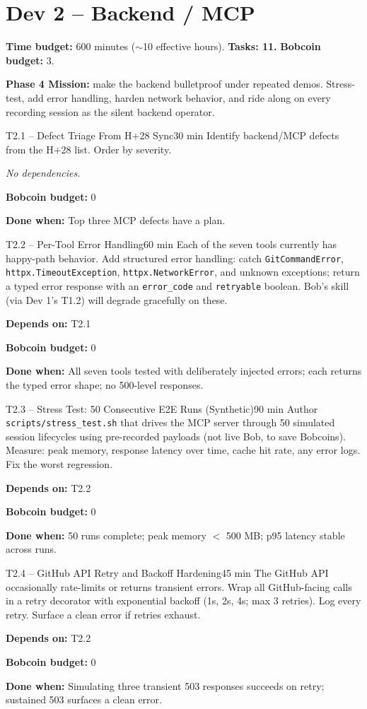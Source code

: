 \documentclass[11pt,letterpaper]{article}
\newcommand{\acceptance}[1]{\par\smallskip\textcolor{ibmgreen}{\textbf{Done when:}} #1}
\newcommand{\depends}[1]{\par\smallskip\textcolor{ibmorange}{\textbf{Depends on:}} #1}
\newcommand{\nodep}{\par\smallskip\textcolor{ibmgray}{\textit{No dependencies.}}}
\newcommand{\bobcost}[1]{\par\smallskip\textcolor{ibmaccent}{\textbf{Bobcoin budget:}} #1}
\begin{document}
\section{Dev 2 -- Backend / MCP}

\textbf{Time budget:} 600 minutes (${\sim}$10 effective hours). \textbf{Tasks: 11.} \textbf{Bobcoin budget:} 3.

\textbf{Phase 4 Mission:} make the backend bulletproof under repeated demos. Stress-test, add error handling, harden network behavior, and ride along on every recording session as the silent backend operator.

\begin{task}{T2.1 -- Defect Triage From H+28 Sync}{30 min}
Identify backend/MCP defects from the H+28 list. Order by severity.
\nodep
\bobcost{0}
\acceptance{Top three MCP defects have a plan.}
\end{task}

\begin{task}{T2.2 -- Per-Tool Error Handling}{60 min}
Each of the seven tools currently has happy-path behavior. Add structured error handling: catch \texttt{GitCommandError}, \texttt{httpx.TimeoutException}, \texttt{httpx.NetworkError}, and unknown exceptions; return a typed error response with an \texttt{error\_code} and \texttt{retryable} boolean. Bob's skill (via Dev 1's T1.2) will degrade gracefully on these.
\depends{T2.1}
\bobcost{0}
\acceptance{All seven tools tested with deliberately injected errors; each returns the typed error shape; no 500-level responses.}
\end{task}

\begin{task}{T2.3 -- Stress Test: 50 Consecutive E2E Runs (Synthetic)}{90 min}
Author \texttt{scripts/stress\_test.sh} that drives the MCP server through 50 simulated session lifecycles using pre-recorded payloads (not live Bob, to save Bobcoins). Measure: peak memory, response latency over time, cache hit rate, any error logs. Fix the worst regression.
\depends{T2.2}
\bobcost{0}
\acceptance{50 runs complete; peak memory $<$ 500 MB; p95 latency stable across runs.}
\end{task}

\begin{task}{T2.4 -- GitHub API Retry and Backoff Hardening}{45 min}
The GitHub API occasionally rate-limits or returns transient errors. Wrap all GitHub-facing calls in a retry decorator with exponential backoff (1s, 2s, 4s; max 3 retries). Log every retry. Surface a clean error if retries exhaust.
\depends{T2.2}
\bobcost{0}
\acceptance{Simulating three transient 503 responses succeeds on retry; sustained 503 surfaces a clean error.}
\end{task}
\end{document}
